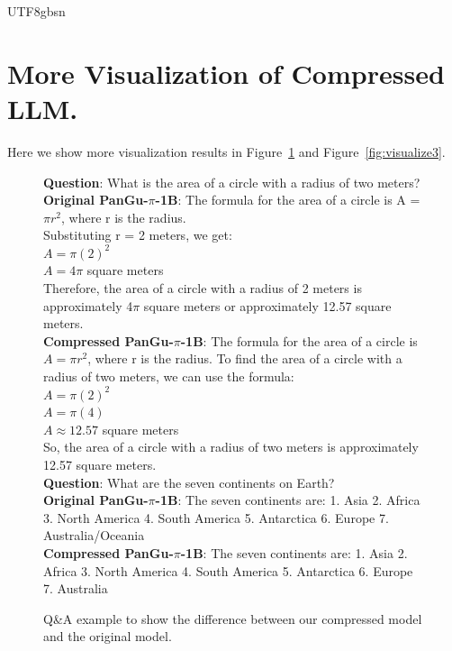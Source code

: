 \documentclass{article}
\theoremstyle{plain}
\theoremstyle{definition}
\theoremstyle{remark}
\begin{document}
\begin{CJK}{UTF8}{gbsn}
\section{More Visualization of Compressed LLM.}
\label{sec:vis}
Here we show more visualization results in Figure~\ref{fig:visualize2} and Figure~\ref{fig:visualize3}.

\begin{figure}[h]
	\begin{center}
		\begin{tcolorbox}[colback=gray!10,%
			colframe=black,%
			width=16cm,%
			arc=1mm, auto outer arc,
			boxrule=0.8pt,
			]
			\textbf{Question}: What is the area of a circle with a radius of two meters?\\
			
			\textbf{Original PanGu-$\pi$-1B}: The formula for the area of a circle is A = $\pi r^2$, where r is the radius.\\
			Substituting r = 2 meters, we get:\\
			$A = \pi(2)^2$\\
			$A = 4\pi$ square meters\\
			Therefore, the area of a circle with a radius of 2 meters is approximately 4$\pi$ square meters or approximately 12.57 square meters.\\
			
			\textbf{Compressed PanGu-$\pi$-1B}: The formula for the area of a circle is $A = \pi r^2$, where r is the radius.
			To find the area of a circle with a radius of two meters, we can use the formula:\\
			$A = \pi(2)^2$\\
			$A = \pi(4)$\\
			$A \approx 12.57$ square meters\\
			So, the area of a circle with a radius of two meters is approximately 12.57 square meters. \\
			
			\textbf{Question}: What are the seven continents on Earth?\\
			
			\textbf{Original PanGu-$\pi$-1B}: The seven continents are: 1. Asia 2. Africa 3. North America 4. South America 5. Antarctica 6. Europe 7. Australia/Oceania\\
			
			\textbf{Compressed PanGu-$\pi$-1B}: The seven continents are: 1. Asia 2. Africa 3. North America 4. South America 5. Antarctica 6. Europe 7. Australia
		\end{tcolorbox}
	\end{center}
	\vspace{-12pt}
	\caption{Q\&A example to show the difference between our compressed model and the original model.}
	\label{fig:visualize2}
\end{figure}


\end{CJK}
\end{document}
